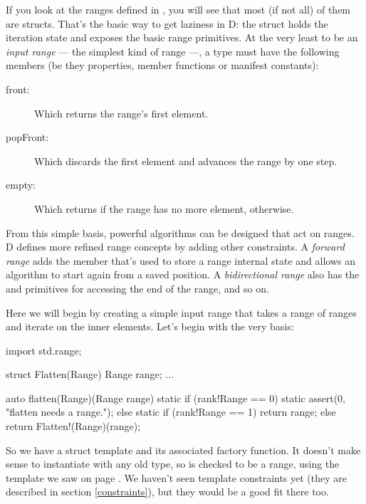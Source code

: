 If you look at the ranges defined in , you will see that most (if not all) of them are structs. That's the basic way to get laziness in D: the struct holds the iteration state and exposes the basic range primitives. At the very least to be an \emph{input range} --- the simplest kind of range ---, a type must have the following members (be they properties, member functions or manifest constants):

\begin{description}
\item[front:] Which returns the range's first element.
\item[popFront:] Which discards the first element and advances the range by one step.
\item[empty:] Which returns  if the range has no more element,  otherwise.
\end{description}

From this simple basis, powerful algorithms can be designed that act on ranges. D defines more refined range concepts by adding other constraints. A \emph{forward range} adds the  member that's used to store a range internal state and allows an algorithm to start again from a saved position. A \emph{bidirectional range} also has the  and  primitives for accessing the end of the range, and so on.

Here we will begin by creating a simple input range that takes a range of ranges and iterate on the inner elements. Let's begin with the very basis:

\begin{dcode}
import std.range;

struct Flatten(Range)
{
    Range range;
    ...
}

auto flatten(Range)(Range range)
{ 
    static if (rank!Range == 0)
        static assert(0, "flatten needs a range.");
    else static if (rank!Range == 1)
        return range;
    else
        return Flatten!(Range)(range);
}
\end{dcode}

So we have a struct template and its associated factory function. It doesn't make sense to instantiate  with any old type, so  is checked to be a range, using the  template we saw on page \pageref{rankforranges}. We haven't seen template constraints yet (they are described in section \ref{constraints}), but they would be a good fit there too.

